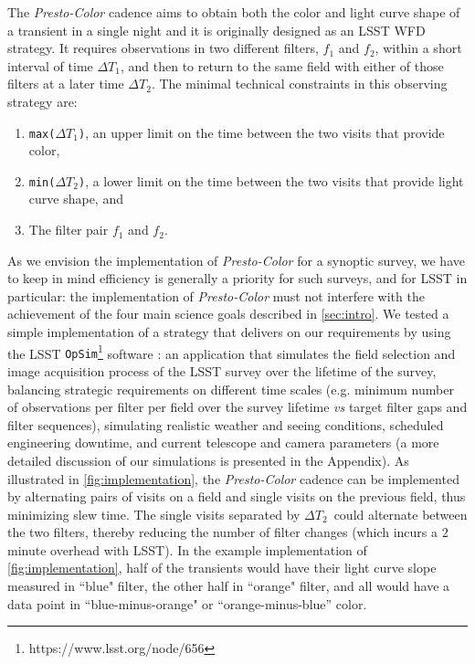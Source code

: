 \documentclass[letterpaper,longauthor,trackchanges,twocolumn,onecolappendix,sort&compress]{aastex62}
\newcommand{\dtone}{\ensuremath{\Delta T_1}}
\newcommand{\dttwo}{\ensuremath{\Delta T_2}}
\begin{document}
The {\em Presto-Color} cadence aims to obtain both the color and light curve shape of a transient in a single night and it is originally designed as an LSST WFD strategy. It requires observations in two different filters, $f_1$ and $f_2$, within a short interval of time \dtone, and then to return to the same field with either of those filters at a later time \dttwo. The minimal technical constraints in this observing strategy are:
\begin{enumerate}
    \item {\tt max(\dtone)}, an upper limit on the time between the two visits that provide color,
    \item {\tt min(\dttwo)}, a lower limit on the time between the two visits that provide light curve shape, and
    \item The filter pair $f_1$ and $f_2$.
\end{enumerate}

As we envision the implementation of {\em Presto-Color} for a synoptic survey, we have to keep in mind efficiency is generally a priority for such surveys, and for LSST in particular: the implementation of {\em Presto-Color} must not interfere with the achievement of the four main science goals described in \autoref{sec:intro}. We tested a simple implementation of a strategy that delivers on our requirements by using the LSST {\tt OpSim}\footnote{https://www.lsst.org/node/656} software \citep{opsim}: an application that simulates the field selection and image acquisition process of the LSST survey over the lifetime of the survey, balancing  strategic requirements on different time scales (e.g. minimum number of observations per filter per field over the survey lifetime \emph{vs} target filter gaps and filter sequences), simulating realistic weather and seeing conditions, scheduled engineering downtime, and current telescope and camera parameters (a more detailed discussion of our simulations is presented in the Appendix). As illustrated in \autoref{fig:implementation}, the {\em Presto-Color} cadence can be implemented by alternating pairs of visits on a field and single visits on the previous field, thus minimizing slew time. The single visits separated by \dttwo\ could alternate between the two filters, thereby reducing the number of filter changes (which incurs a $2$ minute overhead with LSST). In the example implementation of \autoref{fig:implementation}, half of the transients would have their light curve slope measured in ``blue" filter, the other half in ``orange" filter, and all would have a data point in ``blue-minus-orange" or ``orange-minus-blue'' color. 
\end{document}
